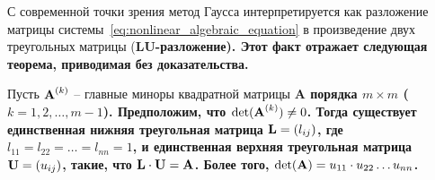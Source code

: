 \documentclass[../../calc-math-exam-2023.tex]{subfiles}
\begin{document}
    С современной точки зрения метод Гаусса интерпретируется как разложение матрицы системы~\eqref{eq:nonlinear_algebraic_equation}
    в произведение двух треугольных матрицы (\bf{LU}-разложение). Этот факт отражает следующая теорема, приводимая без
    доказательства.
    \begin{theorem}
        Пусть $\displaystyle \bf{A}^{(k)}$ -- главные миноры квадратной матрицы \bf{A} порядка $m \times m$ ($k=1,2,\dots,m-1$).
        Предположим, что $\det(\bf{A}^{(k)}) \neq 0$. Тогда существует единственная нижняя треугольная матрица
        $\bf{L} = (l_{ij})$, где $l_{11} = l_{22} = \dots = l_{nn} = 1$, и единственная верхняя треугольная матрица
        $\bf{U} = (u_{ij})$, такие, что $\bf{L} \cdot \bf{U} = \bf{A}$. Более того, $\det(\bf{A}) = u_{11} \cdot u_{22} \dots u_{nn}$.
    \end{theorem}
\end{document}
